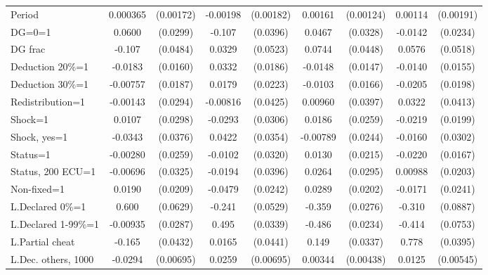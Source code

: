 \begin{tabular}{l|cccccc|cc}
Period          & 0.000365         &(0.00172)& -0.00198         &(0.00182)&  0.00161         &(0.00124)&  0.00114         &(0.00191)\\
DG=0=1          &   0.0600\sym{**} & (0.0299)&   -0.107\sym{***}& (0.0396)&   0.0467         & (0.0328)&  -0.0142         & (0.0234)\\
DG frac         &   -0.107\sym{**} & (0.0484)&   0.0329         & (0.0523)&   0.0744\sym{*}  & (0.0448)&   0.0576         & (0.0518)\\
Deduction 20\%=1&  -0.0183         & (0.0160)&   0.0332\sym{*}  & (0.0186)&  -0.0148         & (0.0147)&  -0.0140         & (0.0155)\\
Deduction 30\%=1& -0.00757         & (0.0187)&   0.0179         & (0.0223)&  -0.0103         & (0.0166)&  -0.0205         & (0.0198)\\
Redistribution=1& -0.00143         & (0.0294)& -0.00816         & (0.0425)&  0.00960         & (0.0397)&   0.0322         & (0.0413)\\
Shock=1         &   0.0107         & (0.0298)&  -0.0293         & (0.0306)&   0.0186         & (0.0259)&  -0.0219         & (0.0199)\\
Shock, yes=1    &  -0.0343         & (0.0376)&   0.0422         & (0.0354)& -0.00789         & (0.0244)&  -0.0160         & (0.0302)\\
Status=1        & -0.00280         & (0.0259)&  -0.0102         & (0.0320)&   0.0130         & (0.0215)&  -0.0220         & (0.0167)\\
Status, 200 ECU=1& -0.00696         & (0.0325)&  -0.0194         & (0.0396)&   0.0264         & (0.0295)&  0.00988         & (0.0203)\\
Non-fixed=1     &   0.0190         & (0.0209)&  -0.0479\sym{**} & (0.0242)&   0.0289         & (0.0202)&  -0.0171         & (0.0241)\\
L.Declared 0\%=1&    0.600\sym{***}& (0.0629)&   -0.241\sym{***}& (0.0529)&   -0.359\sym{***}& (0.0276)&   -0.310\sym{***}& (0.0887)\\
L.Declared 1-99\%=1& -0.00935         & (0.0287)&    0.495\sym{***}& (0.0339)&   -0.486\sym{***}& (0.0234)&   -0.414\sym{***}& (0.0753)\\
L.Partial cheat &   -0.165\sym{***}& (0.0432)&   0.0165         & (0.0441)&    0.149\sym{***}& (0.0337)&    0.778\sym{***}& (0.0395)\\
L.Dec. others, 1000&  -0.0294\sym{***}&(0.00695)&   0.0259\sym{***}&(0.00695)&  0.00344         &(0.00438)&   0.0125\sym{**} &(0.00545)\\

\end{tabular}
